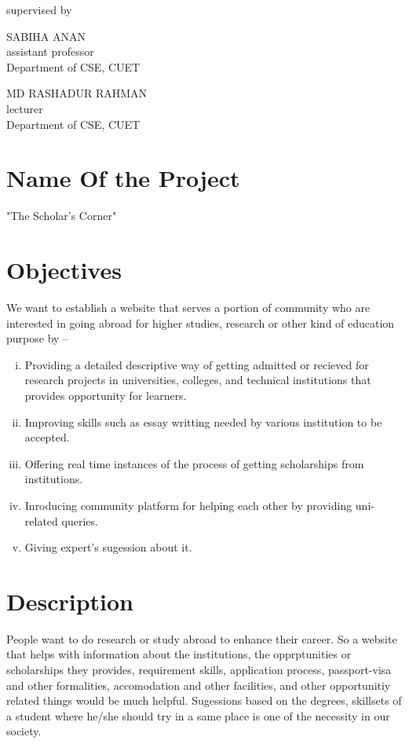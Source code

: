 \documentclass[a4paper,12pt]{report}
\begin{document}
\begin{titlepage}
\vspace{0.5cm}
	supervised by

	\parbox[l]{8cm}{\begin{center}

			SABIHA ANAN\\
\footnotesize{assistant professor\\
	Department of CSE, CUET}
		\end{center}
	}
	\parbox[r]{8cm}{\begin{center}

			MD RASHADUR RAHMAN\\
\footnotesize{lecturer \\
	Department of CSE, CUET}
		\end{center}
	}

	\vfill
\end{titlepage}


\onehalfspacing

\section*{Name Of the Project}
"The Scholar's Corner"
\section*{Objectives}
We want to establish a website that serves a portion of community who are interested in going abroad for higher studies, research or other kind of education purpose by --
\begin{enumerate}[i.]
\item Providing a detailed descriptive way of getting admitted or recieved for research projects in universities, colleges, and technical institutions that provides opportunity for learners.
\item Improving skills such as essay writting needed by various institution to be accepted.
\item Offering real time instances of the process of getting scholarships from institutions.
\item Inroducing community platform for helping each other by providing uni-related queries.
\item Giving expert's sugession about it.
\end{enumerate}
\section*{Description}
People want to do research or study abroad to enhance their career. So a website that helps with information about the institutions, the opprptunities or scholarships they provides, requirement skills, application process, passport-visa and other formalities, accomodation and other facilities, and other opportunitiy related things would be much helpful. Sugessions based on the degrees, skillsets of a student where he/she should try in a same place is one of the necessity in our society.
\end{document}
